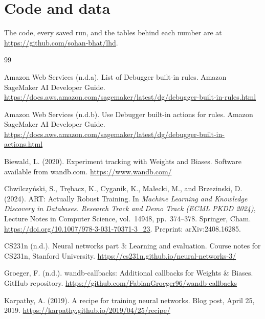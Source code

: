 \documentclass[11pt]{article}
\begin{document}
\section*{Code and data}

The code, every saved run, and the tables behind each number are at \url{https://github.com/sohan-bhat/lhd}.


\begin{thebibliography}{99}

Amazon Web Services (n.d.a).
\newblock List of Debugger built-in rules.
\newblock Amazon SageMaker AI Developer Guide.
\newblock \url{https://docs.aws.amazon.com/sagemaker/latest/dg/debugger-built-in-rules.html}

Amazon Web Services (n.d.b).
\newblock Use Debugger built-in actions for rules.
\newblock Amazon SageMaker AI Developer Guide.
\newblock \url{https://docs.aws.amazon.com/sagemaker/latest/dg/debugger-built-in-actions.html}

Biewald, L. (2020).
\newblock Experiment tracking with Weights and Biases.
\newblock Software available from wandb.com.
\newblock \url{https://www.wandb.com/}

Chwilczy\'nski, S., Tr\k{e}bacz, K., Cyganik, K., Ma\l{}ecki, M., and Brzezinski, D. (2024).
\newblock ART: Actually Robust Training.
\newblock In \emph{Machine Learning and Knowledge Discovery in Databases. Research Track and Demo Track (ECML PKDD 2024)}, Lecture Notes in Computer Science, vol.~14948, pp.~374--378. Springer, Cham.
\newblock \url{https://doi.org/10.1007/978-3-031-70371-3_23}. Preprint: arXiv:2408.16285.

CS231n (n.d.).
\newblock Neural networks part 3: Learning and evaluation.
\newblock Course notes for CS231n, Stanford University.
\newblock \url{https://cs231n.github.io/neural-networks-3/}

Groeger, F. (n.d.).
\newblock wandb-callbacks: Additional callbacks for Weights \& Biases.
\newblock GitHub repository.
\newblock \url{https://github.com/FabianGroeger96/wandb-callbacks}

Karpathy, A. (2019).
\newblock A recipe for training neural networks.
\newblock Blog post, April 25, 2019.
\newblock \url{https://karpathy.github.io/2019/04/25/recipe/}


\end{thebibliography}
\end{document}
